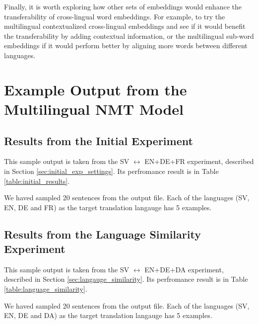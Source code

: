 \documentclass[thesis,fonts=libertine]{cluu}
\begin{document}
Finally, it is worth exploring how other sets of embeddings would enhance the transferability of cross-lingual word embeddings. For example, to try the multilingual contextualized cross-lingual embeddings \textcite{devlin-etal-2019-bert} and see if it would benefit the transferability by adding contextual information, or the multilingual sub-word embeddings \textcite{Heinzerling:2017aa} if it would perform better by aligning more words between different languages.

\appendix
\chapter{Example Output from the Multilingual NMT Model}
\label{chap:example_output}

\section{Results from the Initial Experiment}
This sample output is taken from the SV $\leftrightarrow$ EN+DE+FR experiment, described in Section \ref{sec:initial_exp_settings}. Its perfromance result is in Table \ref{table:initial_results}.

We haved sampled 20 sentences from the output file. Each of the languages (SV, EN, DE and FR) as the target translation langauge has 5 examples.



\section{Results from the Language Similarity Experiment}
This sample output is taken from the SV $\leftrightarrow$ EN+DE+DA experiment, described in Section \ref{sec:langauge_similarity}. Its perfromance result is in Table \ref{table:language_similarity}.

We haved sampled 20 sentences from the output file. Each of the languages (SV, EN, DE and DA) as the target translation langauge has 5 examples.



\printbibliography
\end{document}
